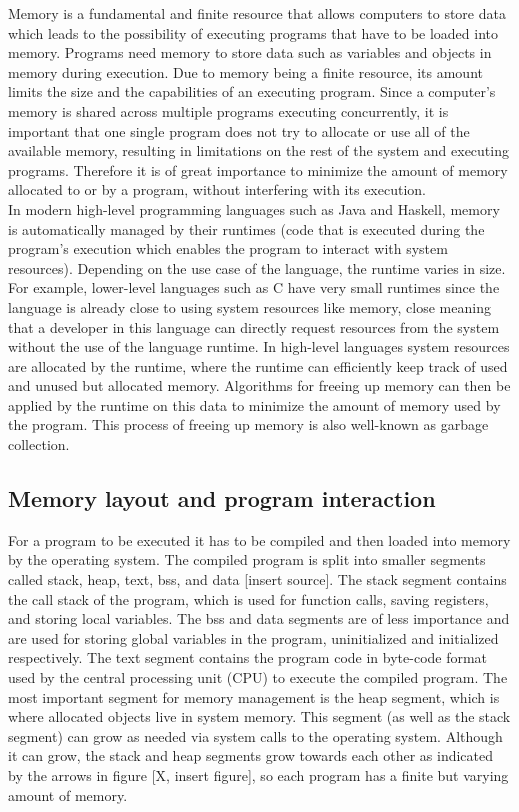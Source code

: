 Memory is a fundamental and finite resource that allows computers to store data which leads to the possibility
of executing programs that have to be loaded into memory. Programs need memory to store data such as variables
and objects in memory during execution. Due to memory being a finite resource, its amount limits the size and
the capabilities of an executing program. Since a computer's memory is shared across multiple programs
executing concurrently, it is important that one single program does not try to allocate or use all of the
available memory, resulting in limitations on the rest of the system and executing programs. Therefore
it is of great importance to minimize the amount of memory allocated to or by a program, without
interfering with its execution.\\

In modern high-level programming languages such as Java and Haskell, memory is automatically managed by
their runtimes (code that is executed during the program's execution which enables the program to interact
with system resources). Depending on the use case of the language, the runtime varies in size. For example, lower-level
languages such as C have very small runtimes since the language is already close to using system resources like
memory, close meaning that a developer in this language can directly request resources from the system
without the use of the language runtime. In high-level languages system resources are allocated by
the runtime, where the runtime can efficiently keep track of used and unused but allocated memory.
Algorithms for freeing up memory can then be applied by the runtime on this data to minimize the amount
of memory used by the program. This process of freeing up memory is also well-known as garbage collection.\\

\subsection{Memory layout and program interaction}

For a program to be executed it has to be compiled and then loaded into memory by the operating system.
The compiled program is split into smaller segments called stack, heap, text, bss, and data [insert source].
The stack segment contains the call stack of the program, which is used for function calls, saving registers,
and storing local variables. The bss and data segments are of less importance and are used for storing
global variables in the program, uninitialized and initialized respectively. The text segment
contains the program code in byte-code format used by the central processing unit (CPU) to execute the
compiled program. The most important segment for memory management is the heap segment, which is where allocated
objects live in system memory. This segment (as well as the stack segment) can grow as needed via system
calls to the operating system. Although it can grow, the stack and heap segments grow towards each other
as indicated by the arrows in figure [X, insert figure], so each program has a finite but varying amount of memory.\\ %

